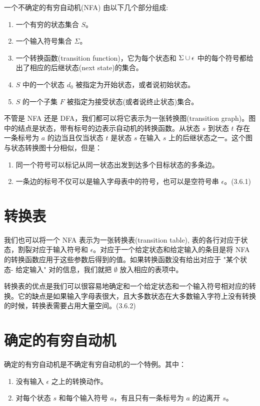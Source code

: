 \documentclass[12pt]{article}
\begin{document}
一个不确定的有穷自动机(NFA) 由以下几个部分组成:
\begin{enumerate}
\item 一个有穷的状态集合 $S$。
\item 一个输入符号集合 $\Sigma$。
\item 一个转换函数(transition function)，它为每个状态和 $\Sigma \cup \\{ \epsilon \\}$ 中的每个符号都给出了相应的后继状态(next state)的集合。
\item $S$ 中的一个状态 $d_{0}$ 被指定为开始状态，或者说初始状态。
\item $S$ 的一个子集 $F$ 被指定为接受状态(或者说终止状态)集合。
\end{enumerate}

不管是 NFA 还是 DFA，我们都可以将它表示为一张转换图(transition graph)。图中的结点是状态，带有标号的边表示自动机的转换函数。从状态 $s$ 到状态 $t$ 存在一条标号为 $a$ 的边当且仅当状态 $t$ 是状态 $s$ 在输入 $s$ 上的后继状态之一。这个图与状态转换图十分相似，但是：

\begin{enumerate}
\item 同一个符号可以标记从同一状态出发到达多个目标状态的多条边。
\item 一条边的标号不仅可以是输入字母表中的符号，也可以是空符号串 $\epsilon$。(3.6.1)
\end{enumerate}

\section*{转换表}

我们也可以将一个 NFA 表示为一张转换表(transition table), 表的各行对应于状态，割裂对应于输入符号和 $\epsilon$。对应于一个给定状态和给定输入的条目是将 NFA 的转换函数应用于这些参数后得到的值。如果转换函数没有给出对应于 "某个状态- 给定输入" 对的信息，我们就把 $\emptyset$ 放入相应的表项中。

转换表的优点是我们可以很容易地确定和一个给定状态和一个输入符号相对应的转换。它的缺点是如果输入字母表很大，且大多数状态在大多数输入字符上没有转换的时候，转换表需要占用大量空间。(3.6.2)

\section*{确定的有穷自动机}

确定的有穷自动机是不确定有穷自动机的一个特例。其中：
\begin{enumerate}
\item 没有输入 $\epsilon$ 之上的转换动作。
\item 对每个状态 $s$ 和每个输入符号 $a$，有且只有一条标号为 $a$ 的边离开 $s$。
\end{enumerate}
\end{document}
